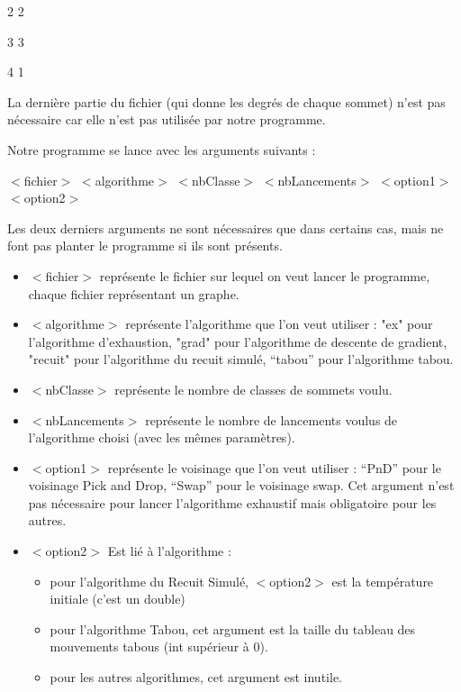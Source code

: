 \documentclass[12pt]{article}
\begin{document}
2 2

3 3

4 1

La dernière partie du fichier (qui donne les degrés de chaque sommet) n’est pas nécessaire car elle n’est pas utilisée par notre programme.
\bigskip

Notre programme se lance avec les arguments suivants :

   $<$fichier$>$ $<$algorithme$>$ $<$nbClasse$>$ $<$nbLancements$>$ $<$option1$>$ $<$option2$>$

\bigskip
   Les deux derniers arguments ne sont nécessaires que dans certains cas, mais ne font pas planter le programme si ils sont présents.

	\begin{itemize}
   \item $<$fichier$>$ représente le fichier sur lequel on veut lancer le programme, chaque fichier représentant un graphe.

  \item  $<$algorithme$>$ représente l'algorithme que l'on veut utiliser : "ex" pour l'algorithme d'exhaustion, "grad" pour l'algorithme de descente de gradient, "recuit" pour l'algorithme du recuit simulé, “tabou” pour l’algorithme tabou.

   \item $<$nbClasse$>$ représente le nombre de classes de sommets voulu.

	\item $<$nbLancements$>$ représente le nombre de lancements voulus de l'algorithme choisi (avec les mêmes paramètres).

   \item $<$option1$>$ représente le voisinage que l’on veut utiliser : “PnD” pour le voisinage Pick and Drop, “Swap” pour le voisinage swap. Cet argument n’est pas nécessaire pour lancer l’algorithme exhaustif mais obligatoire pour les autres.

   \item $<$option2$>$ Est lié à l’algorithme :
		\begin{itemize}
		\item pour l’algorithme du Recuit Simulé, $<$option2$>$ est la température initiale (c’est un double)
		\item pour l’algorithme Tabou, cet argument est la taille du tableau des mouvements tabous (int supérieur à 0).
    	\item pour les autres algorithmes, cet argument est inutile.
    	\end{itemize}
	\end{itemize}
	
\end{document}

